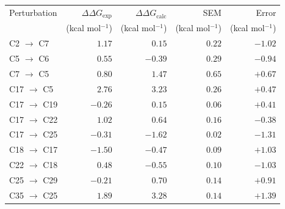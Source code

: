 \begin{table}[htbp]
\centering
\begin{tabular}{lrrrr}
\toprule
Perturbation & $\Delta\Delta G_{\mathrm{exp}}$ & $\Delta\Delta G_{\mathrm{calc}}$ & SEM & Error \\
 & (kcal mol$^{-1}$) & (kcal mol$^{-1}$) & (kcal mol$^{-1}$) & (kcal mol$^{-1}$) \\
\midrule
C2 $\rightarrow$ C7 & $1.17$ & $0.15$ & $0.22$ & $-1.02$ \\
C5 $\rightarrow$ C6 & $0.55$ & $-0.39$ & $0.29$ & $-0.94$ \\
C7 $\rightarrow$ C5 & $0.80$ & $1.47$ & $0.65$ & $+0.67$ \\
C17 $\rightarrow$ C5 & $2.76$ & $3.23$ & $0.26$ & $+0.47$ \\
C17 $\rightarrow$ C19 & $-0.26$ & $0.15$ & $0.06$ & $+0.41$ \\
C17 $\rightarrow$ C22 & $1.02$ & $0.64$ & $0.16$ & $-0.38$ \\
C17 $\rightarrow$ C25 & $-0.31$ & $-1.62$ & $0.02$ & $-1.31$ \\
C18 $\rightarrow$ C17 & $-1.50$ & $-0.47$ & $0.09$ & $+1.03$ \\
C22 $\rightarrow$ C18 & $0.48$ & $-0.55$ & $0.10$ & $-1.03$ \\
C25 $\rightarrow$ C29 & $-0.21$ & $0.70$ & $0.14$ & $+0.91$ \\
C35 $\rightarrow$ C25 & $1.89$ & $3.28$ & $0.14$ & $+1.39$ \\
\bottomrule
\end{tabular}
\end{table}
